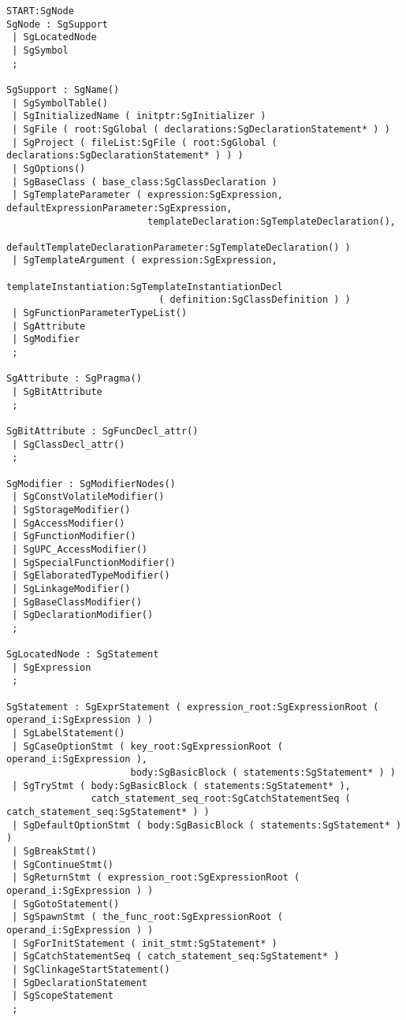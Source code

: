 \begin{verbatim}
START:SgNode
SgNode : SgSupport
 | SgLocatedNode
 | SgSymbol
 ;

SgSupport : SgName()
 | SgSymbolTable()
 | SgInitializedName ( initptr:SgInitializer )
 | SgFile ( root:SgGlobal ( declarations:SgDeclarationStatement* ) )
 | SgProject ( fileList:SgFile ( root:SgGlobal ( declarations:SgDeclarationStatement* ) ) )
 | SgOptions()
 | SgBaseClass ( base_class:SgClassDeclaration )
 | SgTemplateParameter ( expression:SgExpression, defaultExpressionParameter:SgExpression, 
                         templateDeclaration:SgTemplateDeclaration(), 
                         defaultTemplateDeclarationParameter:SgTemplateDeclaration() )
 | SgTemplateArgument ( expression:SgExpression, 
                        templateInstantiation:SgTemplateInstantiationDecl 
                           ( definition:SgClassDefinition ) )
 | SgFunctionParameterTypeList()
 | SgAttribute
 | SgModifier
 ;

SgAttribute : SgPragma()
 | SgBitAttribute
 ;

SgBitAttribute : SgFuncDecl_attr()
 | SgClassDecl_attr()
 ;

SgModifier : SgModifierNodes()
 | SgConstVolatileModifier()
 | SgStorageModifier()
 | SgAccessModifier()
 | SgFunctionModifier()
 | SgUPC_AccessModifier()
 | SgSpecialFunctionModifier()
 | SgElaboratedTypeModifier()
 | SgLinkageModifier()
 | SgBaseClassModifier()
 | SgDeclarationModifier()
 ;

SgLocatedNode : SgStatement
 | SgExpression
 ;

SgStatement : SgExprStatement ( expression_root:SgExpressionRoot ( operand_i:SgExpression ) )
 | SgLabelStatement()
 | SgCaseOptionStmt ( key_root:SgExpressionRoot ( operand_i:SgExpression ), 
                      body:SgBasicBlock ( statements:SgStatement* ) )
 | SgTryStmt ( body:SgBasicBlock ( statements:SgStatement* ), 
               catch_statement_seq_root:SgCatchStatementSeq ( catch_statement_seq:SgStatement* ) )
 | SgDefaultOptionStmt ( body:SgBasicBlock ( statements:SgStatement* ) )
 | SgBreakStmt()
 | SgContinueStmt()
 | SgReturnStmt ( expression_root:SgExpressionRoot ( operand_i:SgExpression ) )
 | SgGotoStatement()
 | SgSpawnStmt ( the_func_root:SgExpressionRoot ( operand_i:SgExpression ) )
 | SgForInitStatement ( init_stmt:SgStatement* )
 | SgCatchStatementSeq ( catch_statement_seq:SgStatement* )
 | SgClinkageStartStatement()
 | SgDeclarationStatement
 | SgScopeStatement
 ;


\end{verbatim}
